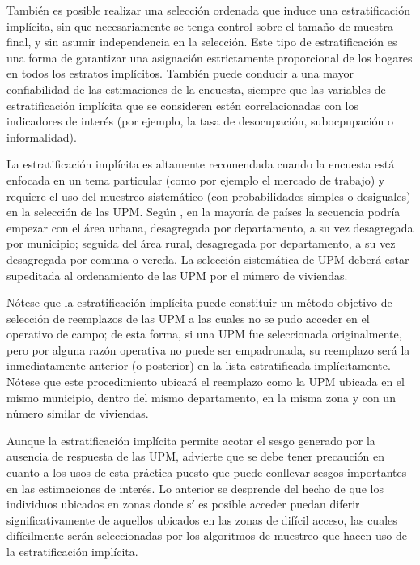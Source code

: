 \documentclass[
  12pt,
  spanish,
]{book}
\begin{document}
También es posible realizar una selección ordenada que induce una estratificación implícita, sin que necesariamente se tenga control sobre el tamaño de muestra final, y sin asumir independencia en la selección. Este tipo de estratificación es una forma de garantizar una asignación estrictamente proporcional de los hogares en todos los estratos implícitos. También puede conducir a una mayor confiabilidad de las estimaciones de la encuesta, siempre que las variables de estratificación implícita que se consideren estén correlacionadas con los indicadores de interés (por ejemplo, la tasa de desocupación, subocpupación o informalidad).

La estratificación implícita es altamente recomendada cuando la encuesta está enfocada en un tema particular (como por ejemplo el mercado de trabajo) y requiere el uso del muestreo sistemático (con probabilidades simples o desiguales) en la selección de las UPM. Según \citet[pág. 46]{UN_2008}, en la mayoría de países la secuencia podría empezar con el área urbana, desagregada por departamento, a su vez desagregada por municipio; seguida del área rural, desagregada por departamento, a su vez desagregada por comuna o vereda. La selección sistemática de UPM deberá estar supeditada al ordenamiento de las UPM por el número de viviendas.

Nótese que la estratificación implícita puede constituir un método objetivo de selección de reemplazos de las UPM a las cuales no se pudo acceder en el operativo de campo; de esta forma, si una UPM fue seleccionada originalmente, pero por alguna razón operativa no puede ser empadronada, su reemplazo será la inmediatamente anterior (o posterior) en la lista estratificada implícitamente. Nótese que este procedimiento ubicará el reemplazo como la UPM ubicada en el mismo municipio, dentro del mismo departamento, en la misma zona y con un número similar de viviendas.

Aunque la estratificación implícita permite acotar el sesgo generado por la ausencia de respuesta de las UPM, \citet[págs. 348 - 349]{Vehovar_1999} advierte que se debe tener precaución en cuanto a los usos de esta práctica puesto que puede conllevar sesgos importantes en las estimaciones de interés. Lo anterior se desprende del hecho de que los individuos ubicados en zonas donde sí es posible acceder puedan diferir significativamente de aquellos ubicados en las zonas de difícil acceso, las cuales difícilmente serán seleccionadas por los algoritmos de muestreo que hacen uso de la estratificación implícita.
\end{document}
